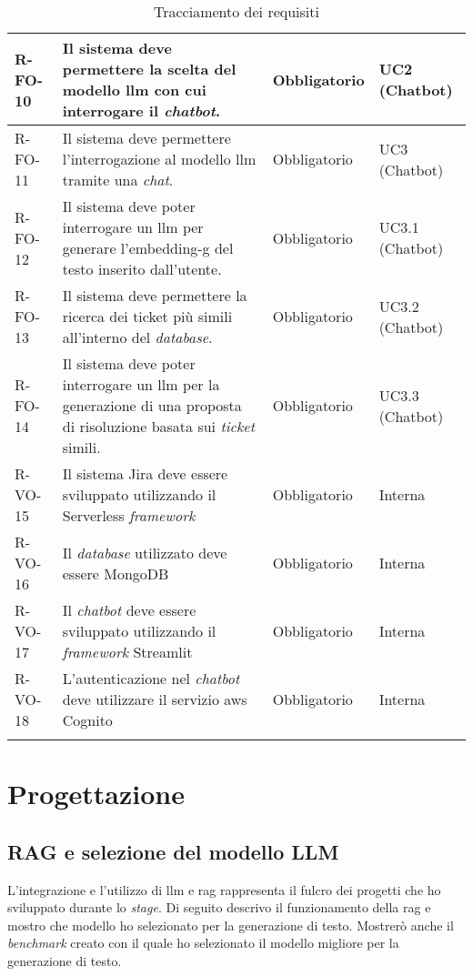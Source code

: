 \begin{longtable}{|p{1.5cm}|p{5.5cm}|p{2cm}|p{2.5cm}|}
    \hline
    \rowcolor{tableevenrow} R-FO-10 & Il sistema deve permettere la scelta del modello \gls{llm} con cui interrogare il \textit{chatbot}. & Obbligatorio & UC2 (Chatbot) \\
    \hline
    R-FO-11 & Il sistema deve permettere l'interrogazione al modello \gls{llm} tramite una \textit{chat}. & Obbligatorio & UC3 (Chatbot) \\
    \hline
    \rowcolor{tableevenrow} R-FO-12 & Il sistema deve poter interrogare un \gls{llm} per generare l'\gls{embedding-g} del testo inserito dall'utente. & Obbligatorio & UC3.1 (Chatbot) \\
    \hline
    R-FO-13 & Il sistema deve permettere la ricerca dei ticket più simili all'interno del \textit{database}. & Obbligatorio & UC3.2 (Chatbot) \\
    \hline
    \rowcolor{tableevenrow} R-FO-14 & Il sistema deve poter interrogare un \gls{llm} per la generazione di una proposta di risoluzione basata sui \textit{ticket} simili. & Obbligatorio & UC3.3 (Chatbot) \\
    \hline
    R-VO-15 & Il sistema Jira deve essere sviluppato utilizzando il Serverless \textit{framework}  & Obbligatorio & Interna \\
    \hline
    \rowcolor{tableevenrow} R-VO-16 & Il \textit{database} utilizzato deve essere MongoDB & Obbligatorio & Interna \\
    \hline
    R-VO-17 & Il \textit{chatbot} deve essere sviluppato utilizzando il \textit{framework} Streamlit & Obbligatorio & Interna \\
    \hline
    \rowcolor{tableevenrow} R-VO-18 & L'autenticazione nel \textit{chatbot} deve utilizzare il servizio \gls{aws} Cognito & Obbligatorio & Interna \\

    
    \hline
    \caption{Tracciamento dei requisiti}
    \label{tab:tracciamentoRequisiti}
\end{longtable}

\section{Progettazione}
\subsection{RAG e selezione del modello LLM} \label{sec:rag}
L'integrazione e l'utilizzo di \gls{llm} e \gls{rag} rappresenta il fulcro dei progetti che ho sviluppato durante lo \textit{stage}.
Di seguito descrivo il funzionamento della \gls{rag} e mostro che modello ho selezionato per la generazione di testo. Mostrerò anche il \textit{benchmark} creato con il quale ho selezionato il modello migliore per la generazione di testo.
